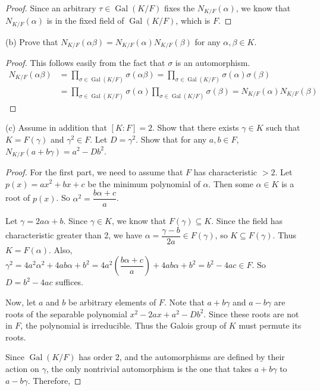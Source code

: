 \documentclass[10pt]{article}
\DeclareMathOperator*{\Gal}{Gal}
\begin{document}
\begin{enumerate}
\begin{proof}
Since an arbitrary $\tau \in \Gal(K/F)$ fixes the $N_{K/F}(\alpha)$, we know that $N_{K/F}(\alpha)$ is in the fixed field of $\Gal(K/F)$, which is $F$.

\end{proof}

(b) Prove that $N_{K/F}(\alpha \beta) = N_{K/F}(\alpha) N_{K/F}(\beta)$ for any $\alpha,\beta \in K$.

\begin{proof}

This follows easily from the fact that $\sigma$ is an automorphism.
\begin{align*}
N_{K/F}(\alpha\beta) &= \prod_{\sigma \in \Gal (K/F)} \sigma(\alpha\beta) = \prod_{\sigma \in \Gal (K/F)} \sigma(\alpha)\sigma(\beta)
\\
&= \prod_{\sigma \in \Gal (K/F)} \sigma(\alpha) \prod_{\sigma \in \Gal (K/F)} \sigma(\beta)
= N_{K/F}(\alpha)N_{K/F}(\beta)
\end{align*}
\end{proof}

(c) Assume in addition that $[K:F]=2$.  Show that there exists $\gamma \in K$ such that $K = F(\gamma)$ and $\gamma^2 \in F$.  Let $D=\gamma^2$.  Show that for any $a,b \in F$, $N_{K/F}(a+b\gamma) = a^2-Db^2$.

\begin{proof}

For the first part, we need to assume that $F$ has characteristic $>2$.  Let $p(x) = ax^2 + bx + c$ be the minimum polynomial of $\alpha$.  Then some $\alpha \in K$ is a root of $p(x)$.  So $\alpha^2 = \dfrac{b\alpha + c}{a}$.

Let $\gamma = 2a\alpha + b$.  Since $\gamma \in K$, we know that $F(\gamma) \subseteq K$.  Since the field has characteristic greater than 2, we have $\alpha = \dfrac{\gamma - b}{2a} \in F(\gamma)$, so $K \subseteq F(\gamma)$.  Thus $K = F(\alpha)$.  Also, $\gamma^2 = 4a^2 \alpha^2 + 4ab\alpha + b^2 = 4a^2\left( \dfrac{b\alpha + c}{a}\right) + 4ab\alpha + b^2 = b^2 - 4ac \in F$.  So $D = b^2 - 4ac$ suffices.

Now, let $a$ and $b$ be arbitrary elements of $F$.  Note that $a + b\gamma$ and $a - b\gamma$ are roots of the separable polynomial $x^2 - 2ax + a^2 - Db^2$.  Since these roots are not in $F$, the polynomial is irreducible.  Thus the Galois group of $K$ must permute its roots.

Since $\Gal(K/F)$ has order 2, and the automorphisms are defined by their action on $\gamma$, the only nontrivial automorphism is the one that takes $a + b\gamma$ to $a - b\gamma$.  Therefore,


\end{proof}
\end{enumerate}
\end{document}
